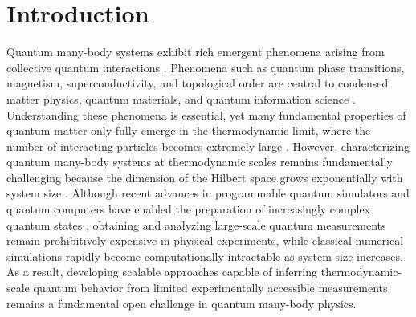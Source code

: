 \documentclass[pdflatex,sn-mathphys-num]{sn-jnl}%
\theoremstyle{thmstyleone}%
\theoremstyle{thmstyletwo}%
\theoremstyle{thmstylethree}%
\begin{document}
\section{Introduction}\label{sec1}

Quantum many-body systems exhibit rich emergent phenomena arising from collective quantum interactions \cite{tokura2017emergent, bruus2004many}. Phenomena such as quantum phase transitions, magnetism, superconductivity, and topological order are central to condensed matter physics, quantum materials, and quantum information science \cite{defenu2024out}. Understanding these phenomena is essential, yet many fundamental properties of quantum matter only fully emerge in the thermodynamic limit, where the number of interacting particles becomes extremely large \cite{sachdev1999quantum}.
However, characterizing quantum many-body systems at thermodynamic scales remains fundamentally challenging because the dimension of the Hilbert space grows exponentially with system size \cite{eisert2010colloquium}. Although recent advances in programmable quantum simulators and quantum computers have enabled the preparation of increasingly complex quantum states \cite{bourgund2025formation, king2025beyond}, obtaining and analyzing large-scale quantum measurements remain prohibitively expensive in physical experiments, while classical numerical simulations rapidly become computationally intractable as system size increases. As a result, developing scalable approaches capable of inferring thermodynamic-scale quantum behavior from limited experimentally accessible measurements remains a fundamental open challenge in quantum many-body physics.
\end{document}
